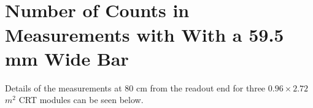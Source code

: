 \documentclass[a4paper]{article}\linespread{1.4}
\begin{document}
\clearpage
\section{\\ Number of Counts in Measurements with With a 59.5 mm Wide Bar} \label{App:AppendixB}
Details of the measurements at 80 cm from the readout end for three $0.96 \times 2.72$~$m^{2}$ CRT modules can be seen below.

\end{document}
